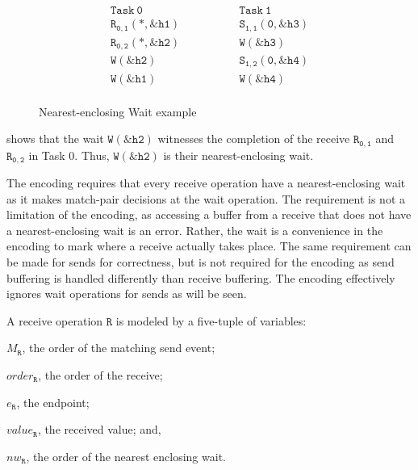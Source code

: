 \begin{figure}[h]
\[
\begin{array}{l|l}
\;\;\;\;\;\;\;\;\mathtt{Task\ 0}\;\;\;\;\;\;\;\; & \;\;\;\;\;\;\;\; \mathtt{Task\ 1}\;\;\;\;\;\;\;\; \\
\hline
\;\;\;\;\;\;\;\;\mathtt{R_{0,1}(*,\&h1)}\;\;\;\;\;\;\;\; & \;\;\;\;\;\;\;\; \mathtt{S_{1,1}(0,\&h3)}\;\;\;\;\;\;\;\; \\
\;\;\;\;\;\;\;\;\mathtt{R_{0,2}(*,\&h2)}\;\;\;\;\;\;\;\; & \;\;\;\;\;\;\;\; \mathtt{W{(\&h3)}}\;\;\;\;\;\;\;\; \\
\;\;\;\;\;\;\;\;\mathtt{W{(\&h2)}}\;\;\;\;\;\;\;\; & \;\;\;\;\;\;\;\; \mathtt{S_{1,2}(0,\&h4)}\;\;\;\;\;\;\;\; \\
\;\;\;\;\;\;\;\;\mathtt{W{(\&h1)}}\;\;\;\;\;\;\;\; & \;\;\;\;\;\;\;\; \mathtt{W{(\&h4)}}\;\;\;\;\;\;\;\; \\
\end{array}
\]
\caption{Nearest-enclosing Wait example} \label{fig:nw}
\end{figure}

 shows that the wait $\mathtt{W{(\&h2)}}$
witnesses the completion of the receive $\mathtt{R_{0,1}}$ and
$\mathtt{R_{0,2}}$ in Task 0. Thus, $\mathtt{W{(\&h2)}}$ is their
nearest-enclosing wait.

The encoding requires that every receive operation have a
nearest-enclosing wait as it makes match-pair decisions at the wait
operation. The requirement is not a limitation of the encoding, as
accessing a buffer from a receive that does not have a
nearest-enclosing wait is an error. Rather, the wait is a convenience
in the encoding to mark where a receive actually takes place. The same
requirement can be made for sends for correctness, but is not required
for the encoding as send buffering is handled differently than receive
buffering.  The encoding effectively ignores wait operations for sends
as will be seen.

\begin{definition}[Receive] \label{def:rcv}
A receive operation $\mathtt{R}$ is modeled by a five-tuple of variables:
\begin{compactenum}
\item $M_\mathtt{R}$, the order of the matching send event;

\item $\mathit{order}_\mathtt{R}$, the order of the receive;

\item $e_\mathtt{R}$, the endpoint;

\item $\mathit{value}_\mathtt{R}$, the received value; and,

\item $\mathit{nw}_\mathtt{R}$, the order of the nearest enclosing wait.
\end{compactenum}
\end{definition}

